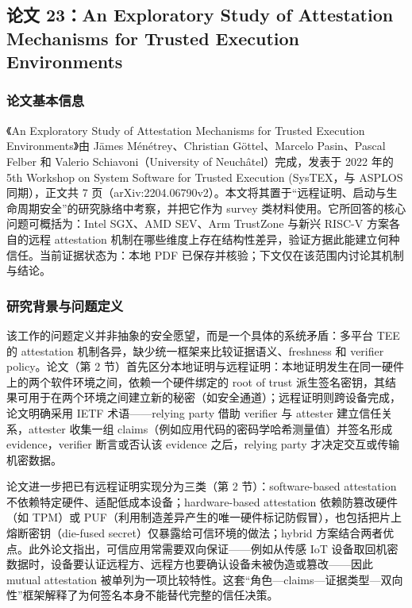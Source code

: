 \documentclass[11pt]{ctexart}
\begin{document}
\subsection{论文 23：An Exploratory Study of Attestation Mechanisms for Trusted Execution Environments}
\subsubsection{论文基本信息}
《An Exploratory Study of Attestation Mechanisms for Trusted Execution Environments》由 Jämes Ménétrey、Christian Göttel、Marcelo Pasin、Pascal Felber 和 Valerio Schiavoni（University of Neuchâtel）完成，发表于 2022 年的 5th Workshop on System Software for Trusted Execution (SysTEX，与 ASPLOS 同期），正文共 7 页（arXiv:2204.06790v2）。本文将其置于“远程证明、启动与生命周期安全”的研究脉络中考察，并把它作为 survey 类材料使用。它所回答的核心问题可概括为：Intel SGX、AMD SEV、Arm TrustZone 与新兴 RISC-V 方案各自的远程 attestation 机制在哪些维度上存在结构性差异，验证方据此能建立何种信任。当前证据状态为：本地 PDF 已保存并核验；下文仅在该范围内讨论其机制与结论。\cite{menetrey2022attestation}\par
\subsubsection{研究背景与问题定义}
该工作的问题定义并非抽象的安全愿望，而是一个具体的系统矛盾：多平台 TEE 的 attestation 机制各异，缺少统一框架来比较证据语义、freshness 和 verifier policy。论文（第 2 节）首先区分本地证明与远程证明：本地证明发生在同一硬件上的两个软件环境之间，依赖一个硬件绑定的 root of trust 派生签名密钥，其结果可用于在两个环境之间建立新的秘密（如安全通道）；远程证明则跨设备完成，论文明确采用 IETF 术语——relying party 借助 verifier 与 attester 建立信任关系，attester 收集一组 claims（例如应用代码的密码学哈希测量值）并签名形成 evidence，verifier 断言或否认该 evidence 之后，relying party 才决定交互或传输机密数据。\par
论文进一步把已有远程证明实现分为三类（第 2 节）：software-based attestation 不依赖特定硬件、适配低成本设备；hardware-based attestation 依赖防篡改硬件（如 TPM）或 PUF（利用制造差异产生的唯一硬件标记防假冒），也包括把片上熔断密钥（die-fused secret）仅暴露给可信环境的做法；hybrid 方案结合两者优点。此外论文指出，可信应用常需要双向保证——例如从传感 IoT 设备取回机密数据时，设备要认证远程方、远程方也要确认设备未被伪造或篡改——因此 mutual attestation 被单列为一项比较特性。这套“角色—claims—证据类型—双向性”框架解释了为何签名本身不能替代完整的信任决策。\par
\end{document}
